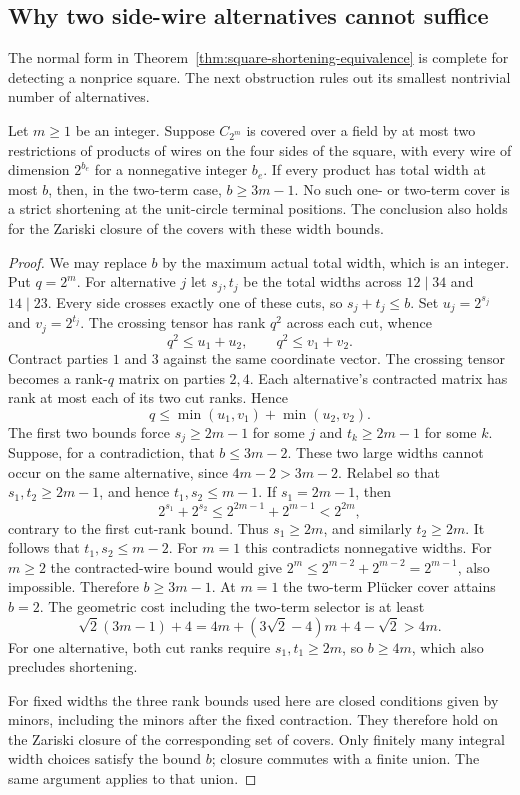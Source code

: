 \subsection{Why two side-wire alternatives cannot suffice}

The normal form in Theorem~\ref{thm:square-shortening-equivalence}
is complete for detecting a nonprice square. The next obstruction
rules out its smallest nontrivial number of alternatives.

\begin{proposition}
\label{prop:two-side-alternatives}
Let $m\geq1$ be an integer. Suppose $C_{2^m}$ is covered over a field by at
most two restrictions of products of wires on the four sides
of the square, with every wire of dimension $2^{b_e}$ for a
nonnegative integer $b_e$. If every product has total width at most $b$,
then, in the two-term case, $b\geq3m-1$.
No such one- or two-term cover is a strict shortening at the
unit-circle terminal positions. The conclusion also holds for
the Zariski closure of the covers with these width bounds.
\end{proposition}
\begin{proof}
We may replace $b$ by the maximum actual total width, which is
an integer. Put $q=2^m$. For alternative $j$ let $s_j,t_j$ be the total
widths across $12\mid34$ and $14\mid23$. Every side crosses
exactly one of these cuts, so $s_j+t_j\leq b$.
Set $u_j=2^{s_j}$ and $v_j=2^{t_j}$.
The crossing tensor has rank $q^2$ across each cut, whence
\[
 q^2\leq u_1+u_2,\qquad q^2\leq v_1+v_2.
\]
Contract parties $1$ and $3$ against the same coordinate
vector. The crossing tensor becomes a rank-$q$ matrix on
parties $2,4$. Each alternative's contracted matrix has rank
at most each of its two cut ranks. Hence
\[
 q\leq\min(u_1,v_1)+\min(u_2,v_2).
\]
The first two bounds force $s_j\geq2m-1$ for some $j$
and $t_k\geq2m-1$ for some $k$.
Suppose, for a contradiction, that $b\leq3m-2$.
These two large widths cannot occur on the same alternative,
since $4m-2>3m-2$. Relabel so that
$s_1,t_2\geq2m-1$, and hence $t_1,s_2\leq m-1$.
If $s_1=2m-1$, then
\[
 2^{s_1}+2^{s_2}\leq2^{2m-1}+2^{m-1}<2^{2m},
\]
contrary to the first cut-rank bound.
Thus $s_1\geq2m$, and similarly $t_2\geq2m$.
It follows that $t_1,s_2\leq m-2$.
For $m=1$ this contradicts nonnegative widths.
For $m\geq2$ the contracted-wire bound would give
$2^m\leq2^{m-2}+2^{m-2}=2^{m-1}$, also impossible.
Therefore $b\geq3m-1$.
At $m=1$ the two-term Pl\"ucker cover attains $b=2$.
The geometric cost including the two-term selector is at least
\[
 \sqrt2(3m-1)+4
 =4m+(3\sqrt2-4)m+4-\sqrt2>4m.
\]
For one alternative, both cut ranks require
$s_1,t_1\geq2m$, so $b\geq4m$, which also precludes shortening.

For fixed widths the three rank bounds used here are closed
conditions given by minors, including the minors after the
fixed contraction. They therefore hold on the Zariski closure
of the corresponding set of covers. Only finitely many
integral width choices satisfy the bound $b$; closure commutes
with a finite union. The same argument applies to that union.
\end{proof}
